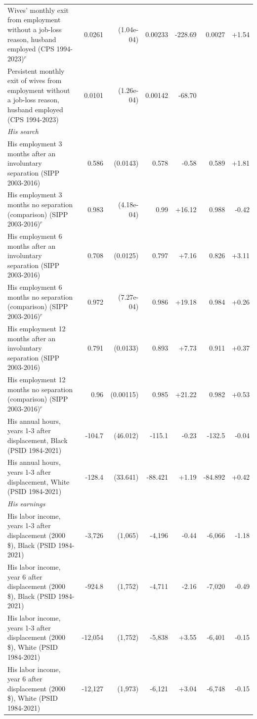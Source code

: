 {\begin{longtable}{p{6.4cm}rrrrrr}
Wives' monthly exit from employment without a job-loss reason, husband employed (CPS 1994-2023)$^{r}$ & 0.0261 & (1.04e-04) & 0.00233 & -228.69 & 0.0027 & +1.54 \\
Persistent monthly exit of wives from employment without a job-loss reason, husband employed (CPS 1994-2023) & 0.0101 & (1.26e-04) & 0.00142 & -68.70 &  &  \\
\multicolumn{7}{l}{\textit{His search}} \\
His employment 3 months after an involuntary separation (SIPP 2003-2016) & 0.586 & (0.0143) & 0.578 & -0.58 & 0.589 & +1.81 \\
His employment 3 months no separation (comparison) (SIPP 2003-2016)$^{r}$ & 0.983 & (4.18e-04) & 0.99 & +16.12 & 0.988 & -0.42 \\
His employment 6 months after an involuntary separation (SIPP 2003-2016) & 0.708 & (0.0125) & 0.797 & +7.16 & 0.826 & +3.11 \\
His employment 6 months no separation (comparison) (SIPP 2003-2016)$^{r}$ & 0.972 & (7.27e-04) & 0.986 & +19.18 & 0.984 & +0.26 \\
His employment 12 months after an involuntary separation (SIPP 2003-2016) & 0.791 & (0.0133) & 0.893 & +7.73 & 0.911 & +0.37 \\
His employment 12 months no separation (comparison) (SIPP 2003-2016)$^{r}$ & 0.96 & (0.00115) & 0.985 & +21.22 & 0.982 & +0.53 \\
His annual hours, years 1-3 after displacement, Black (PSID 1984-2021) & -104.7 & (46.012) & -115.1 & -0.23 & -132.5 & -0.04 \\
His annual hours, years 1-3 after displacement, White (PSID 1984-2021) & -128.4 & (33.641) & -88.421 & +1.19 & -84.892 & +0.42 \\
\multicolumn{7}{l}{\textit{His earnings}} \\
His labor income, years 1-3 after displacement (2000 \$), Black (PSID 1984-2021) & -3,726 & (1,065) & -4,196 & -0.44 & -6,066 & -1.18 \\
His labor income, year 6 after displacement (2000 \$), Black (PSID 1984-2021) & -924.8 & (1,752) & -4,711 & -2.16 & -7,020 & -0.49 \\
His labor income, years 1-3 after displacement (2000 \$), White (PSID 1984-2021) & -12,054 & (1,752) & -5,838 & +3.55 & -6,401 & -0.15 \\
His labor income, year 6 after displacement (2000 \$), White (PSID 1984-2021) & -12,127 & (1,973) & -6,121 & +3.04 & -6,748 & -0.15 \\

\end{longtable}}
